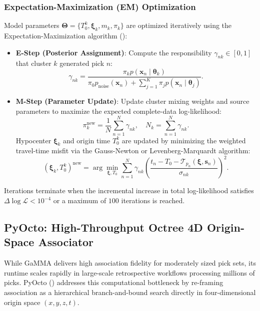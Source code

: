 \subsubsection{Expectation-Maximization (EM) Optimization}
Model parameters $\mathbf{\Theta} = \{T_0^k, \boldsymbol{\xi}_k, m_k, \pi_k\}$ are optimized iteratively using the Expectation-Maximization algorithm (\cite{bishop2006pattern}):
\begin{itemize}
  \item \textbf{E-Step (Posterior Assignment)}: Compute the responsibility $\gamma_{nk} \in [0, 1]$ that cluster $k$ generated pick $n$:
  \begin{equation}
    \gamma_{nk} = \frac{\pi_k p(\mathbf{x}_n \mid \boldsymbol{\theta}_k)}{\pi_0 p_{\mathrm{noise}}(\mathbf{x}_n) + \sum_{j=1}^K \pi_j p(\mathbf{x}_n \mid \boldsymbol{\theta}_j)}.
  \end{equation}
  \item \textbf{M-Step (Parameter Update)}: Update cluster mixing weights and source parameters to maximize the expected complete-data log-likelihood:
  \begin{equation}
    \pi_k^{\mathrm{new}} = \frac{1}{N} \sum_{n=1}^N \gamma_{nk}, \quad N_k = \sum_{n=1}^N \gamma_{nk}.
  \end{equation}
  Hypocenter $\boldsymbol{\xi}_k$ and origin time $T_0^k$ are updated by minimizing the weighted travel-time misfit via the Gauss-Newton or Levenberg-Marquardt algorithm:
  \begin{equation}
    \left(\boldsymbol{\xi}_k, T_0^k\right)^{\mathrm{new}} = \arg\min_{\boldsymbol{\xi}, T_0} \sum_{n=1}^N \gamma_{nk} \left( \frac{t_n - T_0 - \mathcal{T}_{p_n}(\boldsymbol{\xi}, \mathbf{s}_n)}{\sigma_{nk}} \right)^2.
  \end{equation}
\end{itemize}

Iterations terminate when the incremental increase in total log-likelihood satisfies $\Delta \log \mathcal{L} < 10^{-4}$ or a maximum of $100$ iterations is reached.

\subsection{PyOcto: High-Throughput Octree 4D Origin-Space Associator}
While GaMMA delivers high association fidelity for moderately sized pick sets, its runtime scales rapidly in large-scale retrospective workflows processing millions of picks. PyOcto (\cite{PyOcto}) addresses this computational bottleneck by re-framing association as a hierarchical branch-and-bound search directly in four-dimensional origin space $(x, y, z, t)$.

